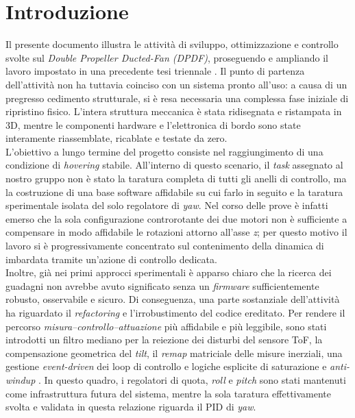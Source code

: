 \documentclass[11pt]{report}
\begin{document}
\section*{Introduzione}
	
Il presente documento illustra le attività di sviluppo, ottimizzazione e controllo svolte sul \textit{Double Propeller Ducted-Fan (DPDF)}, proseguendo e ampliando il lavoro impostato in una precedente tesi triennale \cite{Mincu2025}. Il punto di partenza dell'attività non ha tuttavia coinciso con un sistema pronto all'uso: a causa di un pregresso cedimento strutturale, si è resa necessaria una complessa fase iniziale di ripristino fisico. L'intera struttura meccanica è stata ridisegnata e ristampata in 3D, mentre le componenti hardware e l'elettronica di bordo sono state interamente riassemblate, ricablate e testate da zero.\\
L'obiettivo a lungo termine del progetto consiste nel raggiungimento di una condizione di \textit{hovering} stabile. All'interno di questo scenario, il \textit{task} assegnato al nostro gruppo non è stato la taratura completa di tutti gli anelli di controllo, ma la costruzione di una base software affidabile su cui farlo in seguito e la taratura sperimentale isolata del solo regolatore di \textit{yaw}. Nel corso delle prove è infatti emerso che la sola configurazione controrotante dei due motori non è sufficiente a compensare in modo affidabile le rotazioni attorno all'asse \textit{z}; per questo motivo il lavoro si è progressivamente concentrato sul contenimento della dinamica di imbardata tramite un'azione di controllo dedicata.\\
Inoltre, già nei primi approcci sperimentali è apparso chiaro che la ricerca dei guadagni non avrebbe avuto significato senza un \textit{firmware} sufficientemente robusto, osservabile e sicuro. Di conseguenza, una parte sostanziale dell'attività ha riguardato il \textit{refactoring} e l'irrobustimento del codice ereditato. Per rendere il percorso \textit{misura--controllo--attuazione} più affidabile e più leggibile, sono stati introdotti un filtro mediano per la reiezione dei disturbi del sensore ToF, la compensazione geometrica del \textit{tilt}, il \textit{remap} matriciale delle misure inerziali, una gestione \textit{event-driven} dei loop di controllo e logiche esplicite di saturazione e \textit{anti-windup} \cite{AstromRundqwist1989}. In questo quadro, i regolatori di quota, \textit{roll} e \textit{pitch} sono stati mantenuti come infrastruttura futura del sistema, mentre la sola taratura effettivamente svolta e validata in questa relazione riguarda il PID di \textit{yaw}.\\
\end{document}
